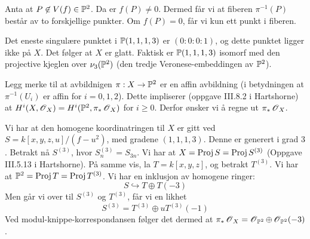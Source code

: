 \documentclass[11pt, norsk]{article}
\begin{document}
Anta at $P \not \in V(f) \in \mathbb{P}^2$. Da er $f(P) \neq 0$. Dermed får vi at fiberen $\pi^{-1}(P)$ består av to forskjellige punkter. Om $f(P)=0$, får vi kun ett punkt i fiberen.

Det eneste singulære punktet i $\mathbb{P}(1,1,1,3)$ er $(0:0:0:1)$, og dette punktet ligger ikke på $X$. Det følger at $X$ er glatt. Faktisk er $\mathbb{P}(1,1,1,3)$ isomorf med den projective kjeglen over $\nu_3(\mathbb{P}^2)$ (den tredje Veronese-embeddingen av $\mathbb{P}^2$).

Legg merke til at avbildnigen $\pi:X \to \mathbb{P}^2$ er en affin avbildning (i betydningen at $\pi^{-1}(U_i)$ er affin for $i=0,1,2$). Dette impliserer (oppgave III.8.2 i Hartshorne) at $H^i(X,\operatorname{\mathscr{O}}_X) = H^i(\mathbb{P}^2,\pi_\ast \operatorname{\mathscr{O}}_X)$ for $i \geq 0$. Derfor ønsker vi å regne ut $\pi_\ast \operatorname{\mathscr{O}}_X$.

Vi har at den homogene koordinatringen til $X$ er gitt ved $S = k[x,y,z,u]/(f-u^2)$, med gradene $(1,1,1,3)$. Denne er generert i grad $3$. Betrakt nå $S^{(3)}$, hvor $S_n^{(3)}=S_{3n}$. Vi har at $X = \operatorname{Proj} S = \operatorname{Proj} S^{(3)}$ (Oppgave III.5.13 i Hartshorne). På samme vis, la $T = k[x,y,z]$, og betrakt $T^{(3)}$. Vi har at $\mathbb{P}^2 = \operatorname{Proj} T = \operatorname{Proj} T^{(3)}$. Vi har en inklusjon av homogene ringer:
$$
S \hookrightarrow T \oplus T(-3)
$$
Men går vi over til $S^{(3)}$ og $T^{(3)}$, får vi en likhet
$$
S^{(3)} = T^{(3)} \oplus u T^{(3)}(-1)
$$
Ved modul-knippe-korrespondansen følger det dermed at $\pi_\ast \operatorname{\mathscr{O}}_X = \operatorname{\mathscr{O}}_{\mathbb{P}^2} \oplus \operatorname{\mathscr{O}}_{\mathbb{P}^2}(-3)$.
\end{document}
